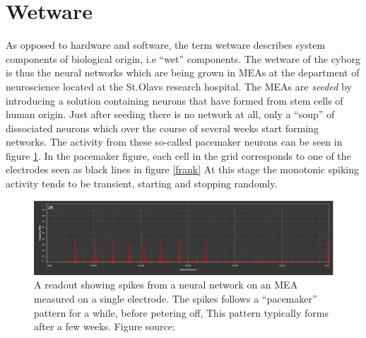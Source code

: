 \section{Wetware}
As opposed to hardware and software, the term wetware describes system
components of biological origin, i.e ``wet'' components.
The wetware of the cyborg is thus the neural networks which are being grown in
MEAs at the department of neuroscience located at the St.Olavs research hospital.
The MEAs are \emph{seeded} by introducing a solution containing neurons that
have formed from stem cells of human origin\cite{TMAC}.
Just after seeding there is no network at all, only a ``soup'' of dissociated
neurons which over the course of several weeks start forming networks.
The activity from these so-called pacemaker neurons can be seen in figure
\ref{pacemaker}.
In the pacemaker figure, each cell in the grid corresponds to one of the
electrodes seen as black lines in figure \ref{frank}
At this stage the monotonic spiking activity tends to be transient, starting and
stopping randomly.
\begin{figure}[h]
  \centering
  \includegraphics[width=1\textwidth]{fig/tonic.png}
  \caption[Pacemaker bursts]{
    A readout showing spikes from a neural network on an MEA measured on a
    single electrode.
    The spikes follows a ``pacemaker'' pattern for a while, before petering off,
    This pattern typically forms after a few weeks.
    Figure source: \cite{TMAC}
  }
  \label{pacemaker}
\end{figure}
